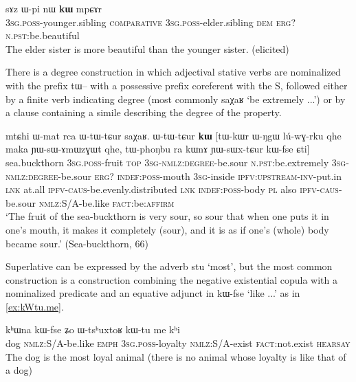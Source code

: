 \documentclass[oldfontcommands,oneside,a4paper,11pt]{article}
\newcommand{\ipa}[1]{{\phon #1}} %
\begin{document}
\begin{exe}
\ex \label{ex:comp1}
\gll  \ipa{ɯ-ʁi}   	\ipa{sɤz}   	\ipa{ɯ-pi}   	\ipa{nɯ}   	\ipa{\textbf{kɯ}}   	\ipa{mpɕɤr}     \\
\textsc{3sg.poss}-younger.sibling \textsc{comparative} \textsc{3sg.poss}-elder.sibling \textsc{dem} \textsc{erg?}  \textsc{n.pst:}be.beautiful \\
\glt The elder sister is more beautiful than the younger sister. (elicited)
\end{exe}

There is a degree construction in which adjectival stative verbs are nominalized with the prefix \ipa{tɯ--} with a possessive prefix coreferent with the S, followed either by a finite verb indicating degree (most commonly \ipa{saχaʁ} `be extremely ...') or by a clause containing a simile describing the degree of the property.


\begin{exe}
\ex \label{ex:YWsWxtCur}
\gll 
\ipa{mtɕhi}  	\ipa{ɯ-mat}  	\ipa{rca}  	\ipa{ɯ-tɯ-tɕur}  	\ipa{saχaʁ.}  	\ipa{ɯ-tɯ-tɕur}  	\ipa{\textbf{kɯ}}  	[\ipa{tɯ-kɯr}  	\ipa{ɯ-ŋgɯ}  	\ipa{lú-wɣ-rku}  	\ipa{qhe}  	\ipa{maka}  	\ipa{ɲɯ-sɯ-ɤmɯzɣɯt}  	\ipa{qhe,}  	\ipa{tɯ-phoŋbu}  	\ipa{ra}  	\ipa{kɯnɤ}  	\ipa{ɲɯ-sɯx-tɕur}  	\ipa{kɯ-fse}  	\ipa{ɕti}]  \\
sea.buckthorn \textsc{3sg.poss}-fruit \textsc{top} \textsc{3sg-nmlz:degree}-be.sour \textsc{n.pst}:be.extremely \textsc{3sg-nmlz:degree}-be.sour \textsc{erg?} \textsc{indef:poss}-mouth \textsc{3sg}-inside \textsc{ipfv:upstream-inv}-put.in \textsc{lnk} at.all \textsc{ipfv-caus}-be.evenly.distributed \textsc{lnk} \textsc{indef:poss}-body \textsc{pl} also \textsc{ipfv-caus}-be.sour \textsc{nmlz:S/A}-be.like \textsc{fact}:be:\textsc{affirm} \\
\glt `The fruit of the sea-buckthorn is very sour, so sour that when one puts it in one's mouth, it makes it completely (sour), and it is as if one's (whole) body became sour.' (Sea-buckthorn, 66)
\end{exe}

Superlative can be expressed by the adverb \ipa{stu} `most', but the most common construction is a construction combining the negative existential copula with a nominalized predicate and an equative adjunct in \ipa{kɯ-fse} `like ...' as in \ref{ex:kWtu.me}.

\begin{exe}
\ex \label{ex:kWtu.me}
\gll 
\ipa{kʰɯna}  	\ipa{kɯ-fse}  	\ipa{ʑo} 	\ipa{ɯ-tsʰuxtoʁ}  	\ipa{kɯ-tu}  	\ipa{me}  	\ipa{kʰi} \\  
dog \textsc{nmlz}:S/A-be.like  \textsc{emph} \textsc{3sg.poss}-loyalty \textsc{nmlz}:S/A-exist \textsc{fact}:not.exist \textsc{hearsay} \\
\glt The dog is the most loyal animal (there is no animal whose loyalty is like that of a dog)
\end{exe}
\end{document}
